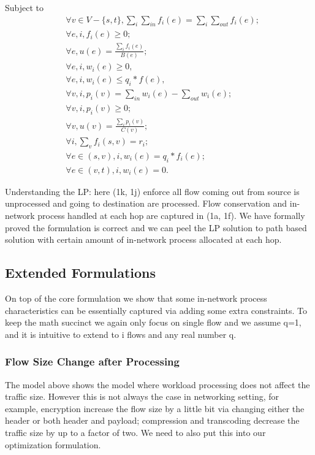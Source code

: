 \documentclass{sig-alternate}
\begin{document}
Subject to
\newline
\begin{subequations}
\begin{align}
&\forall v \in V-\{s, t\}, \sum\limits_i \sum\limits_{in}  f_i(e)= \sum\limits_i  \sum\limits_{out} f_i(e);\\
&\forall e, i, f_i(e) \geq 0;\\
&\forall e, u(e) = \frac{\sum\limits_{i} f_{i}(e) } {B(e)};\\
&\forall e, i, w_i(e) \geq 0,\\
&\forall e, i, w_i(e) \leq q_i* f(e),\\
&\forall v, i, p_i(v) =  \sum\limits_{in } w_i(e) -  \sum\limits_{out} w_i(e) ;\\
&\forall v, i, p_i(v) \geq 0; \\
&\forall v, u(v) = \frac{\sum\limits_{i} p_i(v) } {C(v)} ; \\
&\forall i, \sum\limits_v f_i(s, v) = r_i; \\
&\forall e\in(s, v), i, w_i(e) =q_i* f_i(e);\\
&\forall e\in(v,t), i, w_i(e) =0.
\end{align}
\end{subequations}


Understanding the LP: here (1k, 1j) enforce all flow coming out from source is unprocessed and going to destination are processed. Flow conservation and in-network process handled at each hop are captured in (1a, 1f). We have formally proved the formulation is correct and we can peel the LP solution to path based solution with certain amount of in-network process allocated at each hop.

\subsection{Extended Formulations}
On top of the core formulation we show that some in-network process characteristics can be essentially captured via adding some extra constraints. To keep the math succinct we again only focus on single flow and we assume q=1, and it is intuitive to extend to i flows and any real number q. 

\subsubsection{Flow Size Change after Processing}
The model above shows the model where workload processing does not affect the traffic size. However this is not always the case in networking setting, for example, encryption increase the flow size by a little bit via changing either the header or both header and payload\cite{SIMPLE2013}; compression and transcoding decrease the traffic size by up to a factor of two\cite{Mogul1997}. We need to also put this into our optimization formulation.
\end{document}
